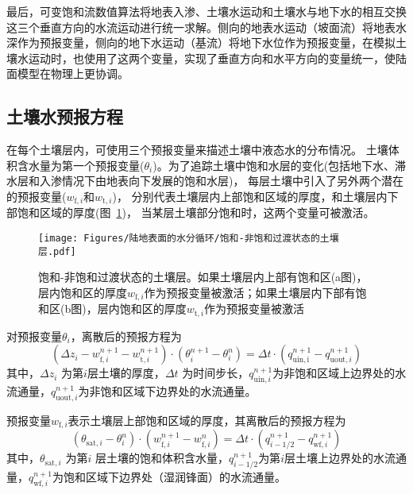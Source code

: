 最后，可变饱和流数值算法将地表入渗、土壤水运动和土壤水与地下水的相互交换这三个垂直方向的水流运动进行统一求解。侧向的地表水运动（坡面流）将地表水深作为预报变量，侧向的地下水运动（基流）将地下水位作为预报变量，在模拟土壤水运动时，也使用了这两个变量，实现了垂直方向和水平方向的变量统一，使陆面模型在物理上更协调。


\subsection{土壤水预报方程}
在每个土壤层内，可使用三个预报变量来描述土壤中液态水的分布情况。
土壤体积含水量为第一个预报变量($\theta_i$)。为了追踪土壤中饱和水层的变化(包括地下水、滞水层和入渗情况下由地表向下发展的饱和水层)，
每层土壤中引入了另外两个潜在的预报变量($w_{\mathrm{f},i}$和$w_{\mathrm{t},i}$)，
分别代表土壤层内上部饱和区域的厚度，和土壤层内下部饱和区域的厚度(图~\ref{fig:饱和-非饱和过渡状态的土壤层})，
当某层土壤部分饱和时，这两个变量可被激活。
{
  \begin{figure}[htbp]
    \centering
    \texttt{[image: Figures/陆地表面的水分循环/饱和-非饱和过渡状态的土壤层.pdf]}
    \caption[饱和-非饱和过渡状态的土壤层]{饱和-非饱和过渡状态的土壤层。如果土壤层内上部有饱和区(a图)，
    层内饱和区的厚度$w_{\mathrm{f},i}$作为预报变量被激活；如果土壤层内下部有饱和区(b图)，层内饱和区的厚度$w_{\mathrm{t},i}$作为预报变量被激活}
    \label{fig:饱和-非饱和过渡状态的土壤层}
  \end{figure}
}

对预报变量$\theta_i$，离散后的预报方程为
\begin{equation}\label{si_in1}
  \left(\Delta z_{i}-w_{\mathrm{f},i}^{n+1}-w_{\mathrm{t},i}^{n+1}\right) \cdot\left(\theta_{i}^{n+1}-\theta_{i}^{n}\right)=\Delta t \cdot\left(q_{\mathrm{ {uin,i }}}^{n+1}-q_{\mathrm{uout},i}^{n+1}\right)
\end{equation}
其中，$\Delta z_i$ 为第$ i $层土壤的厚度，$\Delta t$ 为时间步长，$q_{\mathrm{uin},i}^{n+1}$为非饱和区域上边界处的水流通量，$q_{\mathrm{uout},i}^{n+1}$为非饱和区域下边界处的水流通量。


预报变量$w_{\mathrm{f},i}$表示土壤层上部饱和区域的厚度，其离散后的预报方程为
\begin{equation}\label{si_in2}
  \left(\theta_{\mathrm{sat},i}-\theta_{i}^{n}\right) \cdot\left(w_{\mathrm{f},i}^{n+1}-w_{\mathrm{f},i}^{n}\right)=\Delta t \cdot\left(q_{i-1/2}^{n+1}-q_{\mathrm{w f},i}^{n+1}\right)
\end{equation}
其中，$\theta_{\mathrm{sat},i}$ 为第$ i$ 层土壤的饱和体积含水量，$ q_{{i-1/2}}^{n+1}$为第$i$层土壤上边界处的水流通量，$q_{\mathrm{wf},i}^{n+1}$为饱和区域下边界处（湿润锋面）的水流通量。


